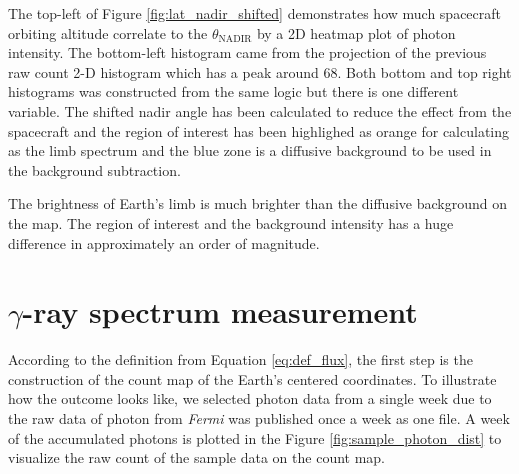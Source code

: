The top-left of Figure \ref{fig:lat_nadir_shifted} demonstrates how 
much spacecraft orbiting altitude correlate to the $\theta_\text{NADIR}$
by a 2D heatmap plot of photon intensity. The bottom-left histogram
came from the projection of the previous raw count 2-D histogram which 
has a peak around 68\textdegree. Both bottom and top right histograms
was constructed from the same logic but there is one different 
variable. The shifted nadir angle has been calculated to reduce the 
effect from the spacecraft and the region of interest has been highlighed 
as orange for calculating as the limb spectrum and the blue zone is 
a diffusive background to be used in the background subtraction.

The brightness of Earth's limb is much brighter than the 
diffusive background on the map. The region of interest and 
the background intensity has a huge difference in approximately
an order of magnitude.


\section{$\gamma$-ray spectrum measurement}

According to the definition from Equation \ref{eq:def_flux}, 
the first step is the construction of the count map of the Earth's 
centered coordinates. To illustrate how the outcome looks like,
we selected photon data from a single week due to the raw data
of photon from \textit{Fermi} was published once a week as one file.
A week of the accumulated photons is plotted in
the Figure \ref{fig:sample_photon_dist} to visualize 
the raw count of the sample data on the count map.

